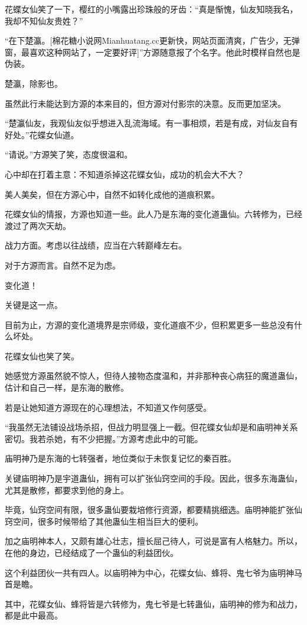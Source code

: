 \begin{this_body}
花蝶女仙笑了一下，樱红的小嘴露出珍珠般的牙齿：“真是惭愧，仙友知晓我名，我却不知仙友贵姓？”

“在下楚瀛。[棉花糖小说网Mianhuatang.cc更新快，网站页面清爽，广告少，无弹窗，最喜欢这种网站了，一定要好评]”方源随意报了个名字。他此时模样自然也是伪装。

楚瀛，除影也。

虽然此行未能达到方源的本来目的，但方源对付影宗的决意。反而更加坚决。

“楚瀛仙友，我观仙友似乎想进入乱流海域。有一事相烦，若是有成，对仙友自有好处。”花蝶女仙道。

“请说。”方源笑了笑，态度很温和。

心中却在打着主意：不知道杀掉这花蝶女仙，成功的机会大不大？

美人美矣，但在方源心中，自然不如转化成他的道痕积累。

花蝶女仙的情报，方源也知道一些。此人乃是东海的变化道蛊仙。六转修为，已经渡过了两次天劫。

战力方面。考虑以往战绩，应当在六转巅峰左右。

对于方源而言。自然不足为虑。

变化道！

关键是这一点。

目前为止，方源的变化道境界是宗师级，变化道痕不少，但积累更多一些总没有什么坏处。

花蝶女仙也笑了笑。

她感觉方源虽然貌不惊人，但待人接物态度温和，并非那种丧心病狂的魔道蛊仙，估计和自己一样，是东海的散修。

若是让她知道方源现在的心理想法，不知道又作何感受。

“我虽然无法铺设战场杀招，但战力明显强上一截。但花蝶女仙却是和庙明神关系密切。我若杀她，有不少把握。”方源考虑此中的可能。

庙明神乃是东海的七转强者，地位类似于未恢复记忆的秦百胜。

关键庙明神乃是宇道蛊仙，拥有可以扩张仙窍空间的手段。因此，很多东海蛊仙，尤其是散修，都要求到他的身上。

毕竟，仙窍空间有限，很多蛊仙要栽培修行资源，都要精挑细选。庙明神能扩张仙窍空间，很多时候带给了其他蛊仙生相当巨大的便利。

加之庙明神本人，又颇有雄心壮志，擅长屈己待人，可说是富有人格魅力。所以，在他的身边，已经结成了一个蛊仙的利益团伙。

这个利益团伙一共有四人。以庙明神为中心，花蝶女仙、蜂将、鬼七爷为庙明神马首是瞻。

其中，花蝶女仙、蜂将皆是六转修为，鬼七爷是七转蛊仙，庙明神的修为和战力，都是此中最高。


\end{this_body}
